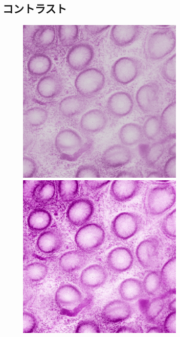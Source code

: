 \subsection*{コントラスト}
\begin{figure}[H]
	\centering
	
	\begin{minipage}{0.25\columnwidth}
		\centering
		\includegraphics[clip, width=\linewidth]{fig/preprocessing/data_aug/color/CONTRAST/CONTRAST_0_50}
	\end{minipage}
	\begin{minipage}{0.25\columnwidth}
		\centering
		\includegraphics[clip, width=\linewidth]{fig/preprocessing/data_aug/color/CONTRAST/CONTRAST_1_00}

\end{minipage}
\end{figure}

